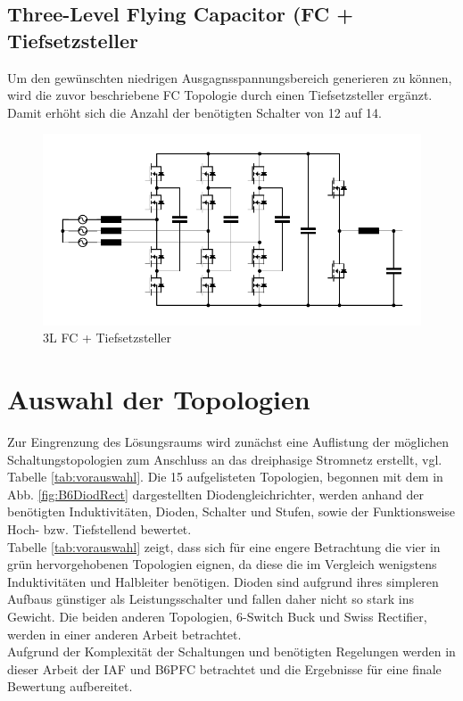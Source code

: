 	
	\subsection{Three-Level Flying Capacitor (FC + Tiefsetzsteller}
		Um den gewünschten niedrigen Ausgagnsspannungsbereich generieren zu können, wird die zuvor beschriebene FC Topologie durch einen Tiefsetzsteller ergänzt. Damit erhöht sich die Anzahl der benötigten Schalter von 12 auf 14.
		\begin{figure}[H]
			\centering
			\includegraphics[width=0.9\linewidth]{content/Grafiken/3L-FC-Boost+Buck}
			\caption{3L FC + Tiefsetzsteller}
			\label{fig:3l-fc-boostbuck}
		\end{figure}

\section{Auswahl der Topologien}
Zur Eingrenzung des Lösungsraums wird zunächst eine Auflistung der möglichen Schaltungstopologien zum Anschluss an das dreiphasige Stromnetz erstellt, vgl. Tabelle \ref{tab:vorauswahl}. Die 15 aufgelisteten Topologien, begonnen mit dem in Abb. \ref{fig:B6DiodRect} dargestellten Diodengleichrichter, werden anhand der benötigten Induktivitäten, Dioden, Schalter und Stufen, sowie der Funktionsweise Hoch- bzw. Tiefstellend bewertet.\\
Tabelle \ref{tab:vorauswahl} zeigt, dass sich für eine engere Betrachtung die vier in grün hervorgehobenen Topologien eignen, da diese die im Vergleich wenigstens Induktivitäten und Halbleiter benötigen. Dioden sind aufgrund ihres simpleren Aufbaus günstiger als Leistungsschalter und fallen daher nicht so stark ins Gewicht. Die beiden anderen Topologien, 6-Switch Buck und Swiss Rectifier, werden in einer anderen Arbeit betrachtet.\\
Aufgrund der Komplexität der Schaltungen und benötigten Regelungen werden in dieser Arbeit der \gls{IAF} und \gls{B6PFC} betrachtet und die Ergebnisse für eine finale Bewertung aufbereitet.

